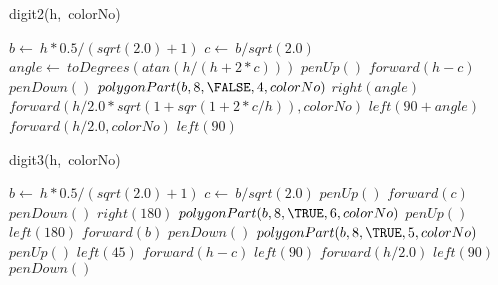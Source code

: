 \documentclass[a4paper,10pt]{article}
\begin{document}
\begin{algorithm}
\caption{digit2(h,\ colorNo)}
\begin{algorithmic}[5]

\STATE {}
\STATE {}
  \STATE \(b\gets\ h*0.5/(sqrt(2.0)+1)\)
  \STATE \(c\gets\ b/sqrt(2.0)\)
  \STATE \(angle\gets\ toDegrees(atan(h/(h+2*c)))\)
  \STATE \(penUp()\)
  \STATE \(forward(h-c)\)
  \STATE \(penDown()\)
  \STATE {}
  \STATE {}
  \STATE \(polygonPart(b,8,\FALSE,4,colorNo)\)
  \STATE \(right(angle)\)
  \STATE \(forward(h/2.0*sqrt(1+sqr(1+2*c/h)),colorNo)\)
  \STATE \(left(90+angle)\)
  \STATE \(forward(h/2.0,colorNo)\)
  \STATE \(left(90)\)

\end{algorithmic}
\end{algorithm}


\begin{algorithm}
\caption{digit3(h,\ colorNo)}
\begin{algorithmic}[5]

\STATE {}
\STATE {}
  \STATE \(b\gets\ h*0.5/(sqrt(2.0)+1)\)
  \STATE \(c\gets\ b/sqrt(2.0)\)
  \STATE \(penUp()\)
  \STATE \(forward(c)\)
  \STATE \(penDown()\)
  \STATE \(right(180)\)
  \STATE {}
  \STATE {}
  \STATE \(polygonPart(b,8,\TRUE,6,colorNo)\)
  \STATE \(penUp()\)
  \STATE \(left(180)\)
  \STATE \(forward(b)\)
  \STATE \(penDown()\)
  \STATE {}
  \STATE {}
  \STATE \(polygonPart(b,8,\TRUE,5,colorNo)\)
  \STATE \(penUp()\)
  \STATE \(left(45)\)
  \STATE \(forward(h-c)\)
  \STATE \(left(90)\)
  \STATE \(forward(h/2.0)\)
  \STATE \(left(90)\)
  \STATE \(penDown()\)

\end{algorithmic}
\end{algorithm}
\end{document}
